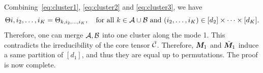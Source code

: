 \documentclass{article}
\begin{document}
\begin{appendices}
Combining~\eqref{eq:cluster1}, \eqref{eq:cluster2} and \eqref{eq:cluster3}, we have
\[
\Theta{i,i_2,\ldots,i_K}=\Theta_{k,i_2,\ldots,i_K},\quad \text{for all } k\in \mathcal{A}\cup \mathcal{B} \text{ and }(i_2,\ldots,i_K)\in[d_2]\times\cdots\times [d_K].
\]
Therefore, one can merge $\mathcal{A}, \mathcal{B}$ into one cluster along the mode 1. This contradicts the irreducibility of the core tensor $\tilde {\mathcal{C}}$. Therefore, $\bm M_1$ and $\tilde {\bm M}_1$ induce a same partition of $[d_1]$, and thus they are equal up to permutations. The proof is now complete. 






\end{appendices}
\end{document}
